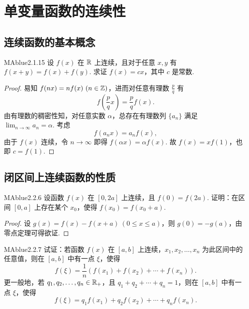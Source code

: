 \chapter{单变量函数的连续性}

\section{连续函数的基本概念}

\begin{problem}{MAblue}{2.1.15}
    设 $f(x)$ 在 $\mathbb R$ 上连续，且对于任意 $x, y$ 有 $f(x+y) = f(x) + f(y)$. 求证 $f(x) = cx$，其中 $c$ 是常数.
\end{problem}

\begin{proof}
    易知 $f(nx) = nf(x) \ (n \in \mathbb Z)$，进而对任意有理数 $\frac p q$ 有
    \[
        f\left( \frac p q x \right) = \frac p q f(x).
    \]
    由有理数的稠密性知，对任意实数 $\alpha$，总存在有理数列 $\{ a_n \}$ 满足 $\lim_{n \to \infty} a_n = \alpha$. 考虑
    \[
       f(a_n x) = a_n f(x),
    \]
    由于 $f(x)$ 连续，令 $n \to \infty$ 即得 $f(\alpha x) = \alpha f(x)$. 故 $f(x) = x f(1)$，也即 $c = f(1)$.
\end{proof}

\section{闭区间上连续函数的性质}

\begin{problem}{MAblue}{2.2.6}
    设函数 $f(x)$ 在 $[0, 2a]$ 上连续，且 $f(0) = f(2a)$. 证明：在区间 $[0, a]$ 上存在某个 $x_0$，使得 $f(x_0) = f(x_0 + a)$.
\end{problem}

\begin{proof}
    设 $g(x) = f(x) - f(x+a) \ (0 \leqslant x \leqslant a)$，则 $g(0) = -g(a)$，由零点定理可得欲证.
\end{proof}

\begin{problem}{MAblue}{2.2.7}
    试证：若函数 $f(x)$ 在 $[a, b]$ 上连续，$x_1, x_2, \ldots, x_n$ 为此区间中的任意值，则在 $[a, b]$ 中有一点 $\xi$，使得
    \[
        f(\xi) = \frac 1 n \left( f(x_1) + f(x_2) + \cdots + f(x_n) \right).
    \]
    更一般地，若 $q_1, q_2, \ldots, q_n \in \mathbb R_+$，且 $q_1 + q_2 + \cdots + q_n = 1$，则在 $[a, b]$ 中有一点 $\xi$，使得
    \[
        f(\xi) = q_1f(x_1) + q_2f(x_2) + \cdots + q_nf(x_n).
    \]
\end{problem}

